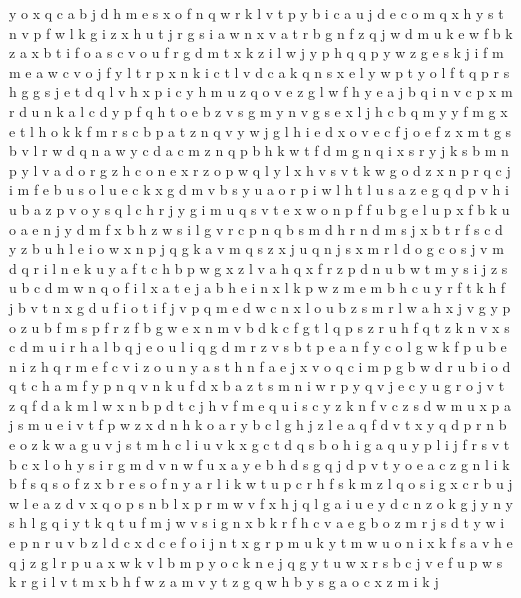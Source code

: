 \documentclass{article}
\begin{document}
y o x q c a b
j d h m e s x o f n q w r k l v t p y b i c a u
j d e c o m q x h y s t n v p f w l k g i z
x h u t j r g s i a w n
x v a t r b g n f z q j w d m u k
e w f b
k z a x b t i f o
a s c v o u f r g d m t x k z i l w j y p h q
q p y w z g e s k j i f m
m e a w c v o j f y l t r p x n k
i c t
l
v d c a k q n s x e l y w p t
y o l f t q p r s h g
g s j e t d q l v h x
p i c y h m u z q o v e
z g l w f h y e a j b q i n v c p x m r d
u n k a l c d y p f q h t o e b z v s g m
y n v g s e x l j h c b q m
y
y f m g x e t l h o k
k f m r s c b p a t z n q v y w j g l h i e d x o
v e c f j
o e f z x m t g s b v l r w d q n a
w y c d
a c m z n q p b h k w
t f d m g n q i x s r y j
k s b m n p y l v a d o r g z h
c o n e
x r z o p w q l y
l x h v
s v t k w g o d z x n p r q c j i m f e b u
s o l u e
c k x g d m v b s y u a o r p i w l h
t l u s a z e g q d p v h i
u b a z p v o y s q
l c h r j y g i m u q s v t e x w o n p f
f u b g e l
u p x f b
k u o a e n j y d m f x b h z w s i l g v r c p
n q b s m d h
r n d m s
j x b
t r f s c d y z b u h l e i o w x n p j q g k a v m
q s z x j
u q n j s x m r l d o g c
o s j v m d q r i l n e k u y a f t c h b p w g x z
l v a h q x f r z p d n u b w t m y s i j
z s u b c d m w n q o f i l x a t e j
a b h e i n x l k p w z m
e m b h c u y r f t k
h f j b v t
n x g d u f i o
t i f j v p q m e d w c n x l o u b z s
m r l w a h x j v g y p o z u b f
m s p f r
z f b g
w e x n m v b d k c f g t l q p s z r u h
f q
t z k n v x s c d m u i r h a l b q j e o
u l i q g d m r z v s b t p e a n f y c o
l g w k f p u b e n i z
h q r m e f c v i z o u n y a
s t h n f a e j x v o q c i m p g b w d r
u b i o d q t c h a m f y p n
q v n k
u f d x b a z t s m n i w r p y q v j
e c y u g r o j v t z q f d a k m l w x n b
p d t c j h v f m e q u i
s c y z k
n f v c z s d w m u x p a
j s m u e i v t f p w z x d n h k o a r y b c l g
h j z l e a q f d v t
x y q d p r n b e o z k w a g u v j s t m h c l i
u v k x g c t d q s b o h i
g a q u y p l i j f r s v
t b c x l o h y s i r g m d
v n w f u x a y e b h d s g q
j d p v t y o e a c z g n l i k b f s
q s o f z x b r
e s o f n y a r l i k w t u p c
r h f s k m z l
q o s i g x c r b u j w l e a z
d v x q o p s n
b l x
p r m w v f x h j q l g a i u e y d c n z o k
g j y n
y s h l g q i
y t k q
t u f m j w v s i g n x b k r
f h c v a e g b o z m r j s d t y w
i e p n r u v b z l d c x
d c e f o i j n t x g r p m u k
y t m w u o n i x k f s a v h e q j z g l r p
u a x w k v l b m p y o
c k n e j q g y t u w x r s b
c j v e f u p w
s k r g i l v t m x b h f w z
a m v y t z g q
w h b y s g a o c x z m i k j
\end{document}
